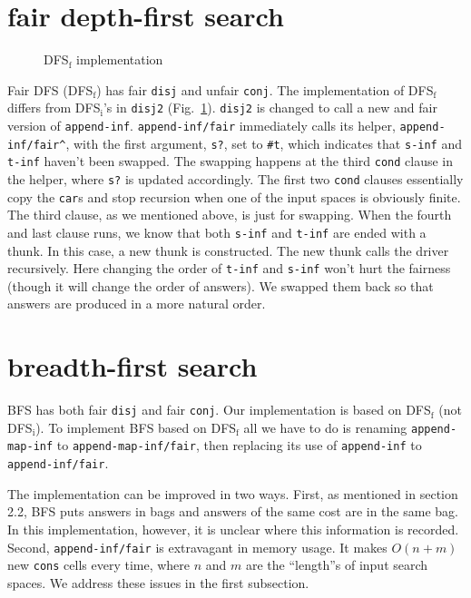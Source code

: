 \documentclass[format=acmlarge, review=true, authordraft=true]{acmart}
\newcommand{\conj}{\texttt{conj}}
\newcommand{\disj}{\texttt{disj}}
\newcommand{\DFSf}[0]{DFS$_\textrm{f}$}
\newcommand{\BFS }[0]{BFS}
\begin{document}
\section{fair depth-first search}

\begin{figure}
	
	\caption{DFS$_\textrm{f}$ implementation}
	\label{fDFS}
\end{figure}

Fair DFS (DFS$_\textrm{f}$) has fair \disj{} and unfair \conj{}. The implementation of DFS$_\textrm{f}$ 
differs from DFS$_\textrm{i}$'s in \texttt{disj2} (Fig.~\ref{fDFS}). \texttt{disj2} is 
changed to call a new and fair version of \texttt{append-inf}. 
\texttt{append-inf/fair} immediately calls its helper, 
\texttt{append-inf/fair\^{}}, with the first argument, \texttt{s?}, set to 
\texttt{\#{}t}, which indicates that \texttt{s-inf} and \texttt{t-inf} haven't 
been swapped. The swapping happens at the third \texttt{cond} clause in the 
helper, where \texttt{s?} is updated accordingly. The first two \texttt{cond} 
clauses essentially copy the \texttt{car}s and stop recursion when one of the 
input spaces is obviously finite. The third clause, as we mentioned above, is 
just for swapping. When the fourth and last clause runs, we know that both 
\texttt{s-inf} and \texttt{t-inf} are ended with a thunk. In this case, a new 
thunk is constructed. The new thunk calls the driver recursively. Here changing 
the order of \texttt{t-inf} and \texttt{s-inf} won't hurt the fairness (though 
it will change the order of answers). We swapped them back so that answers are 
produced in a more natural order.


\section{breadth-first search}

BFS has both fair \disj{} and fair \conj{}. Our implementation is based on 
DFS$_\textrm{f}$ (not DFS$_\textrm{i}$). To implement \BFS{} based on \DFSf{} 
all we have to do is renaming 
\texttt{append-map-inf} to \texttt{append-map-inf/fair}, then replacing its use 
of \texttt{append-inf} to \texttt{append-inf/fair}. 

The implementation can be improved in two ways. First, as mentioned in 
section 2.2, BFS puts answers in bags and answers of the same cost are in the 
same bag. In this implementation, however, it is unclear where this information 
is recorded. Second, 
\texttt{append-inf/fair} is extravagant in memory usage. It makes 
$O(n+m)$ new \texttt{cons} cells every time, where $n$ and $m$ are the 
``length''s of input search spaces. We address these issues in the first 
subsection.
\end{document}
